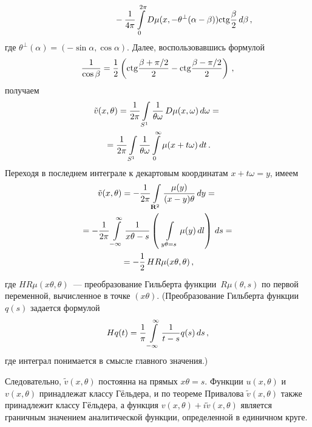 \begin{multicols}{2}
\noindent
\begin{equation*}
\ \ \ \ \ \ \ \ \ \ \ \ \ \ \ \ \ \ {}-
\displaystyle\frac{\displaystyle 1\mathstrut}{\displaystyle 4\pi\mathstrut}\int\limits_{0}^{2\pi}D\mu(x,-\theta^{\perp}(\alpha-\beta))\mathrm{ ctg}\displaystyle\frac{\displaystyle \beta\mathstrut}{\displaystyle 2\mathstrut}\,d\beta\,,
\end{equation*}
где $\theta^{\perp}(\alpha)=(-\sin\alpha,\cos\alpha)$. Далее,
воспользовавшись формулой
$$
\displaystyle\frac{\displaystyle 1\mathstrut}{\displaystyle \cos\beta\mathstrut}=\displaystyle\frac{\displaystyle 1\mathstrut}{\displaystyle 2\mathstrut}\left(\mathrm{ ctg}\displaystyle\frac{\displaystyle \beta+\pi/2\mathstrut}{\displaystyle 2\mathstrut}-\mathrm{ ctg}\displaystyle\frac{\displaystyle \beta-\pi/2\mathstrut}{\displaystyle 2\mathstrut}
\right)\,,
$$ 
получаем
\begin{multline*}
\tilde{v}(x,\theta)=\displaystyle\frac{\displaystyle 1\mathstrut}{\displaystyle 2\pi\mathstrut}\int\limits_{S^1}\displaystyle\frac{\displaystyle 1\mathstrut}{\displaystyle \theta\omega\mathstrut}\,D\mu(x,\omega)\,d\omega={}\\
{}=
\displaystyle\frac{\displaystyle 1\mathstrut}{\displaystyle 2\pi\mathstrut}\int\limits_{S^1}\displaystyle\frac{\displaystyle 1\mathstrut}{\displaystyle \theta \omega\mathstrut}\int\limits_{0}^{\infty}\mu(x+t\omega)\,dt\,.
\end{multline*}
Переходя в последнем интеграле к декартовым координатам
$x+t\omega=y$, имеем
\begin{multline*}
\tilde{v}(x,\theta)=-\fr{1}{2\pi}\int\limits_{\mathbf{R}^2}\fr{\mu(y)}{(x-y)\theta}\,dy={}\\
{}=
-\fr{1}{2\pi}\int\limits_{-\infty}^{\infty}\fr{1}{x\theta-s}\left(\ 
\int\limits_{\,y\theta=s}\mu(y)\,dl\right)\,ds={}\\
{}=-\fr{1}{2}\,HR\mu(x\theta,\theta)\,,
\end{multline*} 
где
$HR\mu(x\theta,\theta)$~--- преобразование Гильберта 
функции~$R\mu(\theta,s)$ по первой переменной, вычисленное в точке 
$(x\theta)$. (Преобразование Гильберта функции~$q(s)$ задается
формулой
$$
Hq(t)=\displaystyle\frac{\displaystyle 1\mathstrut}{\displaystyle \pi\mathstrut}\int\limits_{-\infty}^{\infty}\displaystyle\frac{\displaystyle 1\mathstrut}{\displaystyle t-s\mathstrut}q(s)\,ds\,,
$$ 
где интеграл понимается в смысле главного значения.)

 Следовательно, $\tilde{v}(x,\theta)$
постоянна на прямых $x\theta=s$. Функции $u(x,\theta)$ и
$v(x,\theta)$ принадлежат классу Гёльдера, и по теореме Привалова
$\tilde{v}(x,\theta)$ также принадлежит классу Гёльдера, а функция
$v(x,\theta)+i\tilde{v}(x,\theta)$ является граничным значением
аналитической функции, определенной в единичном круге.


\end{multicols}
